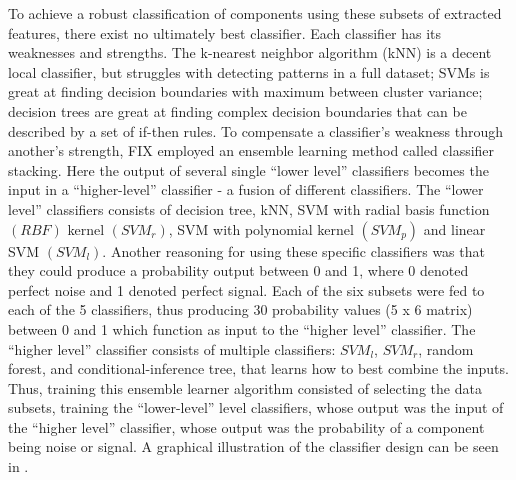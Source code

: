 To achieve a robust classification of components using these subsets of extracted features, there exist no ultimately best classifier. Each classifier has its weaknesses and strengths. The k-nearest neighbor algorithm (kNN) is a decent local classifier, but struggles with detecting patterns in a full dataset; SVMs is great at finding decision boundaries with maximum between cluster variance; decision trees are great at finding complex decision boundaries that can be described by a set of if-then rules. To compensate a classifier’s weakness through another’s strength, FIX employed an ensemble learning method called classifier stacking. Here the output of several single “lower level” classifiers becomes the input in a “higher-level” classifier - a fusion of different classifiers. The “lower level” classifiers consists of decision tree, kNN, SVM with radial basis function $(RBF)$ kernel $(SVM_r)$, SVM with polynomial kernel $(SVM_p)$ and linear SVM $(SVM_l)$. Another reasoning for using these specific classifiers was that they could produce a probability output between 0 and 1, where 0 denoted perfect noise and 1 denoted perfect signal. Each of the six subsets were fed to each of the 5 classifiers, thus producing 30 probability values (5 x 6 matrix) between 0 and 1 which function as input to the “higher level” classifier. The “higher level” classifier consists of multiple classifiers: $SVM_l$, $SVM_r$, random forest, and conditional-inference tree, that learns how to best combine the inputs. \\
Thus, training this ensemble learner algorithm consisted of selecting the data subsets, training the “lower-level” level classifiers, whose output was the input of the “higher level” classifier, whose output was the probability of a component being noise or signal. A graphical illustration of the classifier design can be seen in . 

